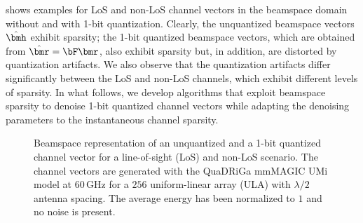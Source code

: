  shows examples for LoS and non-LoS channel vectors in the beamspace domain without and with 1-bit quantization. 
%
Clearly, the unquantized beamspace vectors $\hhat$ exhibit sparsity; the 1-bit quantized beamspace vectors, which are obtained from $\rhat = \bF\bmr$, also exhibit sparsity but, in addition, are distorted by quantization artifacts.
%
We also observe that the quantization artifacts differ significantly between the LoS and non-LoS channels, which exhibit different levels of sparsity. 
%
In what follows, we develop algorithms that exploit beamspace sparsity to denoise 1-bit quantized channel vectors while adapting the denoising parameters to the instantaneous channel sparsity. 


\begin{figure}[tp]
\vspace{-0.35cm}
\caption{Beamspace representation of an unquantized and a 1-bit quantized channel vector for a line-of-sight (LoS) and non-LoS scenario. The channel vectors are generated with the QuaDRiGa mmMAGIC UMi model \cite{jaeckel2019quadriga} at $60$\,GHz for a $256$ uniform-linear array (ULA) with $\lambda/2$ antenna spacing. The average energy has been normalized to $1$ and no noise is present.} 
\label{fig:sparse_channel}
\end{figure}

